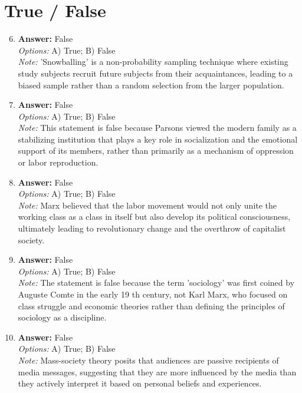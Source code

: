 \documentclass[12pt]{article}
\begin{document}
\section*{True / False}
\begin{enumerate}[label=\arabic*.]
\setcounter{enumi}{5}
\item \textbf{Answer:} False
\\ \textit{Options:} A) True; B) False
\\ \textit{Note:} 'Snowballing' is a non-probability sampling technique where existing study subjects recruit future subjects from their acquaintances, leading to a biased sample rather than a random selection from the larger population.
\item \textbf{Answer:} False
\\ \textit{Options:} A) True; B) False
\\ \textit{Note:} This statement is false because Parsons viewed the modern family as a stabilizing institution that plays a key role in socialization and the emotional support of its members, rather than primarily as a mechanism of oppression or labor reproduction.
\item \textbf{Answer:} False
\\ \textit{Options:} A) True; B) False
\\ \textit{Note:} Marx believed that the labor movement would not only unite the working class as a class in itself but also develop its political consciousness, ultimately leading to revolutionary change and the overthrow of capitalist society.
\item \textbf{Answer:} False
\\ \textit{Options:} A) True; B) False
\\ \textit{Note:} The statement is false because the term 'sociology' was first coined by Auguste Comte in the early 19 th century, not Karl Marx, who focused on class struggle and economic theories rather than defining the principles of sociology as a discipline.
\item \textbf{Answer:} False
\\ \textit{Options:} A) True; B) False
\\ \textit{Note:} Mass-society theory posits that audiences are passive recipients of media messages, suggesting that they are more influenced by the media than they actively interpret it based on personal beliefs and experiences.
\end{enumerate}
\end{document}
